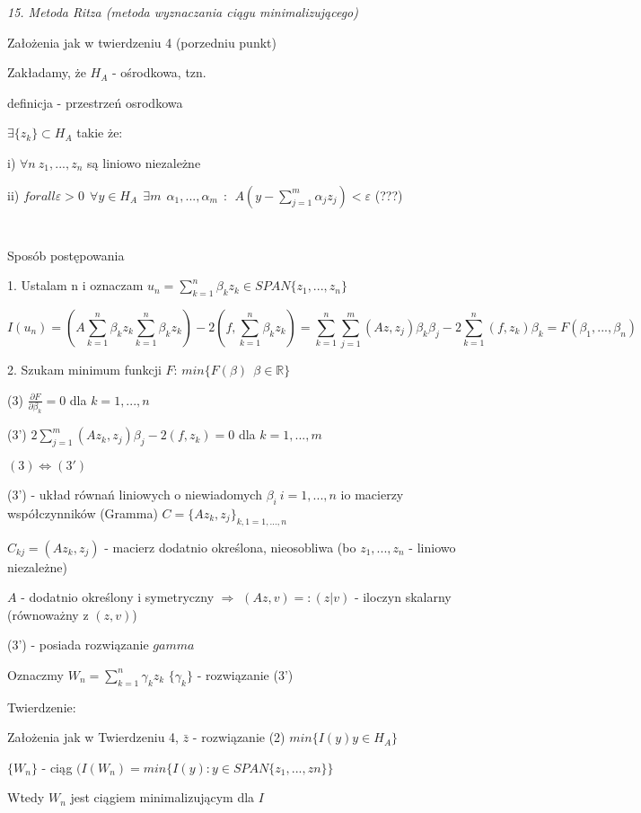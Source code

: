 \textit{15. Metoda Ritza (metoda wyznaczania ciągu minimalizującego)}

Założenia jak w twierdzeniu 4 (porzedniu punkt)

Zakładamy, że $H_A$ - ośrodkowa, tzn.

definicja - przestrzeń osrodkowa

$\exists \{z_k\} \subset H_A$ takie że:

i) $\forall n\ z_1, ..., z_n$ są liniowo niezależne

ii) $forall \varepsilon > 0\ \ \forall y \in H_A \ \ \exists m\ \ \alpha _1, ..., \alpha _m\ \ : \ \ A(y - \sum_{j=1}^{m} \alpha _j z_j) < \varepsilon$ (???)

$\ $

$\ $

Sposób postępowania

1. Ustalam n i oznaczam $u_n = \sum_{k=1}^{n} \beta _k z_k \in SPAN\{z_1, ..., z_n\}$

\[ I(u_n) = (A\sum_{k=1}^{n} \beta _k z_k \sum_{k=1}^{n} \beta _k z_k) - 2(f, \sum_{k=1}^{n} \beta _k z_k) = \sum_{k=1}^{n}\sum_{j=1}^{m} (Az,z_j) \beta _k \beta _j - 2\sum_{k=1}^{n} (f, z_k) \beta _k = F(\beta _1, ..., \beta _n)\]

2. Szukam minimum funkcji $F$: $min\{F(\beta)\ \ \beta \in \mathbb{R}\}$

(3) $\frac{\partial F}{\partial \beta _k} = 0$ dla $k = 1,...,n$

(3') $2 \sum_{j=1}^{m} (Az_k, z_j) \beta _j - 2(f, z_k) = 0$ dla $k = 1,...,m$

$ (3) \Leftrightarrow (3') $

(3') - układ równań liniowych o niewiadomych $\beta _i\ i = 1,...,n$ io macierzy współczynników (Gramma) $C = \{ Az_k, z_j \}_{k,1 = 1,...,n}$

$C_{kj} = (Az_k, z_j)$ - macierz dodatnio określona, nieosobliwa (bo $z_1,...,z_n$ - liniowo niezależne)

$A$ - dodatnio określony i symetryczny $\Rightarrow$ $(Az,v) =: (z|v)$ - iloczyn skalarny (równoważny z $(z,v)$)

(3') - posiada rozwiązanie $gamma$

Oznaczmy $W_n = \sum_{k=1}^{n} \gamma _k z_k$        $\{\gamma _k\}$ - rozwiązanie (3')

Twierdzenie:

Założenia jak w Twierdzeniu 4, $\bar{z}$ - rozwiązanie (2) $ min\{ I(y) y \in H_A \}$

$\{W_n\}$ - ciąg $(I(W_n) = min\{I(y): y \in SPAN\{z_1,...,zn\}\}$

Wtedy ${W_n}$ jest ciągiem minimalizującym dla $I$

